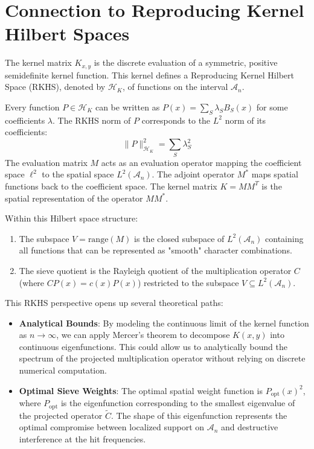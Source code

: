 \documentclass[10pt,twoside]{article}
\newcommand{\mathcalA}{\mathcal{A}}
\begin{document}
\section{Connection to Reproducing Kernel Hilbert Spaces} \label{sec:rkhs}

The kernel matrix $K_{x, y}$ is the discrete evaluation of a symmetric, positive semidefinite kernel function. This kernel defines a Reproducing Kernel Hilbert Space (RKHS), denoted by $\mathcal{H}_K$, of functions on the interval $\mathcalA_n$.

Every function $P \in \mathcal{H}_K$ can be written as $P(x) = \sum_S \lambda_S B_S(x)$ for some coefficients $\lambda$. The RKHS norm of $P$ corresponds to the $L^2$ norm of its coefficients:
\begin{equation}
\|P\|_{\mathcal{H}_K}^2 = \sum_S \lambda_S^2
\end{equation}
The evaluation matrix $M$ acts as an evaluation operator mapping the coefficient space $\ell^2$ to the spatial space $L^2(\mathcalA_n)$. The adjoint operator $M^*$ maps spatial functions back to the coefficient space. The kernel matrix $K = M M^T$ is the spatial representation of the operator $M M^*$.

Within this Hilbert space structure:
\begin{enumerate}
    \item The subspace $V = \text{range}(M)$ is the closed subspace of $L^2(\mathcalA_n)$ containing all functions that can be represented as "smooth" character combinations.
    \item The sieve quotient is the Rayleigh quotient of the multiplication operator $C$ (where $C P(x) = c(x) P(x)$) restricted to the subspace $V \subseteq L^2(\mathcalA_n)$.
\end{enumerate}

This RKHS perspective opens up several theoretical paths:
\begin{itemize}
    \item \textbf{Analytical Bounds}: By modeling the continuous limit of the kernel function as $n \to \infty$, we can apply Mercer's theorem to decompose $K(x, y)$ into continuous eigenfunctions. This could allow us to analytically bound the spectrum of the projected multiplication operator without relying on discrete numerical computation.
    \item \textbf{Optimal Sieve Weights}: The optimal spatial weight function is $P_{\text{opt}}(x)^2$, where $P_{\text{opt}}$ is the eigenfunction corresponding to the smallest eigenvalue of the projected operator $\tilde{C}$. The shape of this eigenfunction represents the optimal compromise between localized support on $\mathcalA_n$ and destructive interference at the hit frequencies.
\end{itemize}
\end{document}
